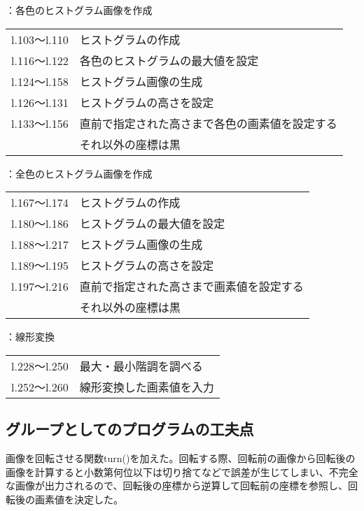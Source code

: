 \documentclass{jsarticle}
\begin{document}
：各色のヒストグラム画像を作成

\begin{table}[H]
    \begin{tabular}{ll}
        l.103〜l.110 & ヒストグラムの作成\\
        l.116〜l.122 & 各色のヒストグラムの最大値を設定\\
        l.124〜l.158 & ヒストグラム画像の生成\\
        l.126〜l.131 & ヒストグラムの高さを設定\\
        l.133〜l.156 & 直前で指定された高さまで各色の画素値を設定する\\
                     & それ以外の座標は黒\\
    \end{tabular}
\end{table}

：全色のヒストグラム画像を作成

\begin{table}[H]
    \begin{tabular}{ll}
        l.167〜l.174 & ヒストグラムの作成\\
        l.180〜l.186 & ヒストグラムの最大値を設定\\
        l.188〜l.217 & ヒストグラム画像の生成\\
        l.189〜l.195 & ヒストグラムの高さを設定\\
        l.197〜l.216 & 直前で指定された高さまで画素値を設定する\\
                     & それ以外の座標は黒\\
    \end{tabular}
\end{table}

：線形変換

\begin{table}[H]
    \begin{tabular}{ll}
        l.228〜l.250 & 最大・最小階調を調べる\\
        l.252〜l.260 & 線形変換した画素値を入力\\
    \end{tabular}
\end{table}

\subsection{グループとしてのプログラムの工夫点}

画像を回転させる関数turn()を加えた。回転する際、回転前の画像から回転後の画像を計算すると小数第何位以下は切り捨てなどで誤差が生じてしまい、不完全な画像が出力されるので、回転後の座標から逆算して回転前の座標を参照し、回転後の画素値を決定した。
\end{document}
